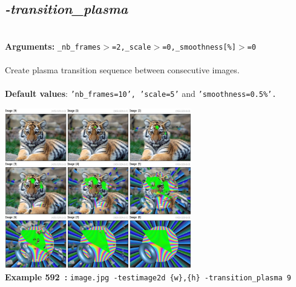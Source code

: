 \documentclass[a4paper,11pt,twoside]{book}
\begin{document}
\subsection{\emph{-transition\_plasma} }\vspace*{-0.5em}
~\\\textbf{Arguments: } 
{\small \texttt{\_nb\_frames$>$=2,\_scale$>$=0,\_smoothness[\%]$>$=0}}\\~\\
Create plasma transition sequence between consecutive images.
~\\~\\\textbf{Default values}: {\small \texttt{'nb\_frames=10', 'scale=5'} and \texttt{'smoothness=0.5\%'.}}
\begin{center}\includegraphics[keepaspectratio=true,height=7cm,width=\textwidth]{img/gmic_def592.jpg}\\
{\footnotesize \textbf{Example 592~:} \texttt{image.jpg -testimage2d \{w\},\{h\} -transition\_plasma 9}}
\end{center}
\end{document}
